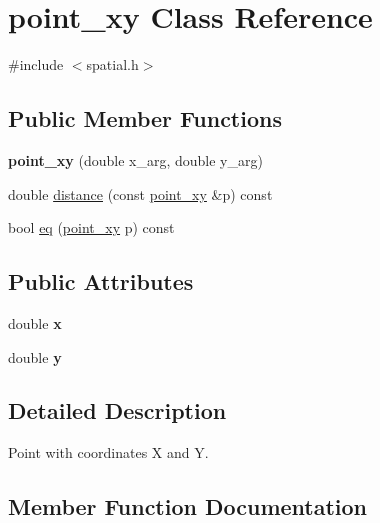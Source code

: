 \hypertarget{classpoint__xy}{}\section{point\+\_\+xy Class Reference}
\label{classpoint__xy}


{\ttfamily \#include $<$spatial.\+h$>$}

\subsection*{Public Member Functions}
\begin{DoxyCompactItemize}
\item 
\mbox{\label{classpoint__xy_a4e7b6e83f7bfa4c3ee7c89bc15c8b0f1}} 
{\bfseries point\+\_\+xy} (double x\+\_\+arg, double y\+\_\+arg)
\item 
double \mbox{\hyperlink{classpoint__xy_ae974d854d4e56badb3afdc3a9973bb7b}{distance}} (const \mbox{\hyperlink{classpoint__xy}{point\+\_\+xy}} \&p) const
\item 
bool \mbox{\hyperlink{classpoint__xy_a8d5a5b0b2b032db98336b854b6ec15e5}{eq}} (\mbox{\hyperlink{classpoint__xy}{point\+\_\+xy}} p) const
\end{DoxyCompactItemize}
\subsection*{Public Attributes}
\begin{DoxyCompactItemize}
\item 
\mbox{\label{classpoint__xy_a95d92238022e4264fe44d3c94eaafaf9}} 
double {\bfseries x}
\item 
\mbox{\label{classpoint__xy_afd0c82fbb5d0530cf101e3b8f5f72963}} 
double {\bfseries y}
\end{DoxyCompactItemize}


\subsection{Detailed Description}
Point with coordinates X and Y. 

\subsection{Member Function Documentation}
\mbox{\label{classpoint__xy_ae974d854d4e56badb3afdc3a9973bb7b}} 
